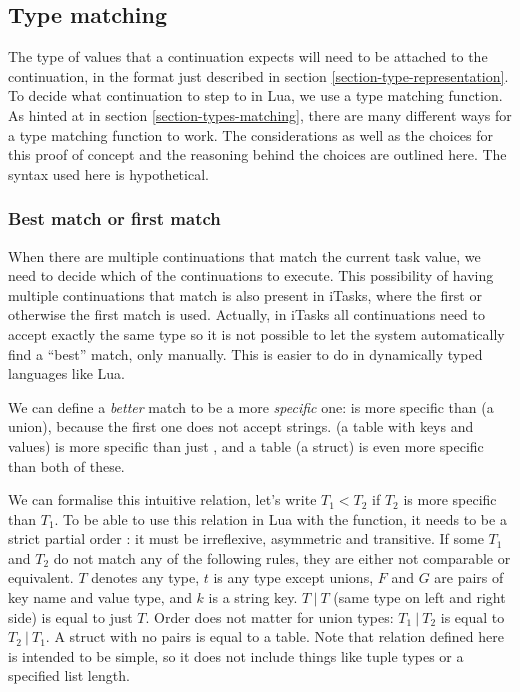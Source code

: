 \subsection{Type matching}\label{section-combinators-type-matching}
The type of values that a continuation expects will need to be attached to the continuation, in the format just described in section \ref{section-type-representation}. To decide what continuation to step to in Lua, we use a type matching function. As hinted at in section \ref{section-types-matching}, there are many different ways for a type matching function to work. The considerations as well as the choices for this proof of concept and the reasoning behind the choices are outlined here. The syntax used here is hypothetical.

\subsubsection{Best match or first match}
When there are multiple continuations that match the current task value, we need to decide which of the continuations to execute. This possibility of having multiple continuations that match is also present in iTasks, where the first  or otherwise the first  match is used. Actually, in iTasks all continuations need to accept exactly the same type so it is not possible to let the system automatically find a ``best'' match, only manually. This is easier to do in dynamically typed languages like Lua.

We can define a \textit{better} match to be a more \textit{specific} one:  is more specific than  (a union), because the first one does not accept strings.  (a table with  keys and  values) is more specific than just , and a table  (a struct) is even more specific than both of these.


We can formalise this intuitive relation, let's write $T_1 < T_2$ if $T_2$ is more specific than $T_1$. To be able to use this relation in Lua with the  function, it needs to be a strict partial order \cite[\S 6.6]{luareferencemanual}: it must be irreflexive, asymmetric and transitive. If some $T_1$ and $T_2$ do not match any of the following rules, they are either not comparable or equivalent. $T$ denotes any type, $t$ is any type except unions, $F$ and $G$ are pairs of key name and value type, and $k$ is a string key. $T\ |\ T$ (same type on left and right side) is equal to just $T$. Order does not matter for union types: $T_1\ |\ T_2$ is equal to $T_2\ |\ T_1$. A struct with no pairs is equal to a table. Note that relation defined here is intended to be simple, so it does not include things like tuple types or a specified list length.

